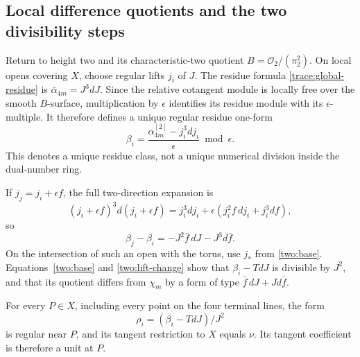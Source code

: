 \subsection{Local difference quotients and the two divisibility steps}

Return to height two and its characteristic-two quotient
$B=\mathcal O_2/(\pi_2^2)$. On local opens covering $X$, choose
regular lifts $j_i$ of $J$. The residue formula
\eqref{trace:global-residue} is
$\bar\alpha_{4m}=J^3dJ$. Since the relative cotangent module
is locally free over the smooth $B$-surface, multiplication
by $\epsilon$ identifies its residue module with its
$\epsilon$-multiple. It therefore defines a unique regular
residue one-form
\begin{equation}
 \beta_i=\frac{\alpha_{4m}^{[2]}-j_i^3dj_i}{\epsilon}\bmod\epsilon.
 \label{two:local-quotient}
\end{equation}
This denotes a unique residue class, not a unique numerical
division inside the dual-number ring.

If $j_j=j_i+\epsilon f$, the full two-direction expansion is
\[
 (j_i+\epsilon f)^3d(j_i+\epsilon f)
 =j_i^3dj_i+\epsilon(j_i^2f\,dj_i+j_i^3df),
\]
so
\begin{equation}
 \beta_j-\beta_i=-J^2\bar f\,dJ-J^3d\bar f.
 \label{two:lift-change}
\end{equation}
On the intersection of such an open with the torus, use
$j_*$ from \eqref{two:base}. Equations~\eqref{two:base}
and \eqref{two:lift-change} show that $\beta_i-TdJ$ is
divisible by $J^2$, and that its quotient differs from
$\chi_m$ by a form of type $\bar f\,dJ+Jd\bar f$.

\begin{lemma}
\label{two:division}
For every $P\in X$, including every point on the four terminal lines,
the form
\begin{equation}
 \rho_i=(\beta_i-TdJ)/J^2
 \label{two:rho}
\end{equation}
is regular near $P$, and its tangent restriction to $X$ equals
$\nu$. Its tangent coefficient is therefore a unit at $P$.
\end{lemma}

